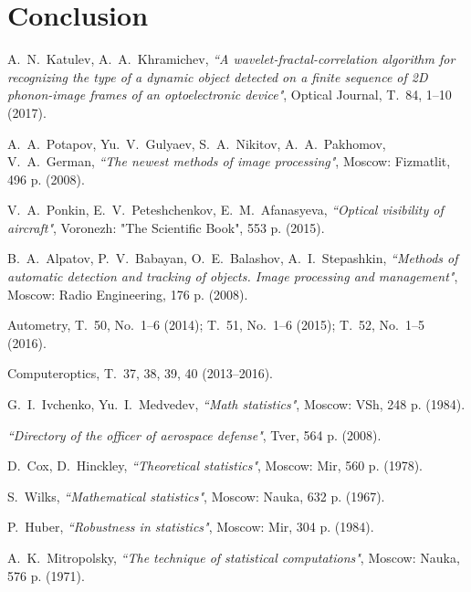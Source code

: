 \documentclass[
11pt,%
tightenlines,%
twoside,%
onecolumn,%
nofloats,%
nobibnotes,%
nofootinbib,%
superscriptaddress,%
noshowpacs,%
centertags]%
{revtex4}
\begin{document}


\section{Conclusion}



\begin{thebibliography}{99}

A.~N.~Katulev, A.~A.~Khramichev, {\it ``A wavelet-fractal-correlation algorithm for recognizing the type of a dynamic object detected on a finite sequence of 2D phonon-image frames of an optoelectronic device"}, Optical Journal, T.~84, 1--10 (2017).

A.~A.~Potapov, Yu.~V.~Gulyaev, S.~A.~Nikitov, A.~A.~Pakhomov, V.~A.~German, {\it ``The newest methods of image processing"}, Moscow: Fizmatlit, 496 p. (2008).

V.~A.~Ponkin, E.~V.~Peteshchenkov, E.~M.~Afanasyeva, {\it ``Optical visibility of aircraft"}, Voronezh: "The Scientific Book", 553 p. (2015).

B.~A.~Alpatov, P.~V.~Babayan, O.~E.~Balashov, A.~I.~Stepashkin, {\it ``Methods of automatic detection and tracking of objects. Image processing and management"}, Moscow: Radio Engineering, 176 p. (2008).

Autometry, T.~50, No.~1--6 (2014); T.~51, No.~1--6 (2015); T.~52, No.~1--5 (2016).

Computeroptics, T.~37, 38, 39, 40 (2013--2016).

G.~I.~Ivchenko, Yu.~I.~Medvedev, {\it ``Math statistics"}, Moscow: VSh, 248 p. (1984).

{\it ``Directory of the officer of aerospace defense"}, Tver, 564 p. (2008).

D.~Cox, D.~Hinckley, {\it ``Theoretical statistics"}, Moscow: Mir, 560 p. (1978).

S.~Wilks, {\it ``Mathematical statistics"}, Moscow: Nauka, 632 p. (1967).

P.~Huber, {\it ``Robustness in statistics"}, Moscow: Mir, 304 p. (1984).

A.~K.~Mitropolsky, {\it ``The technique of statistical computations"}, Moscow: Nauka, 576 p. (1971).


\end{thebibliography}
\end{document}

